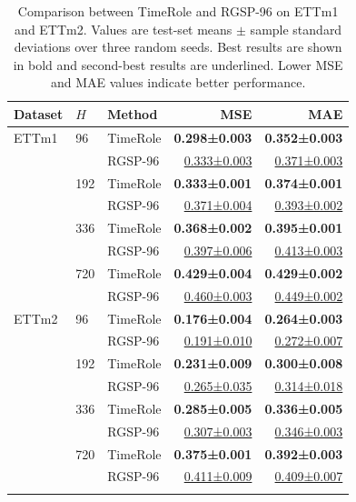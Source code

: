 \begin{table}[!t]
\tablecaptionfont
\caption{Comparison between TimeRole and RGSP-96 on ETTm1 and ETTm2. Values are test-set means $\pm$ sample standard deviations over three random seeds. Best results are shown in bold and second-best results are underlined. Lower MSE and MAE values indicate better performance.}
\label{tab:recent96-comparison}
\centering
\tablebodyfont
\fontsize{7.7}{8.9}\selectfont
\setlength{\tabcolsep}{3pt}
\renewcommand{\arraystretch}{1.08}
\begin{tabular*}{\columnwidth}{@{\extracolsep{\fill}}lllrr@{}}
\toprule\noalign{}
Dataset & \(H\) & Method & MSE & MAE \\
\midrule\noalign{}
ETTm1 & 96 & TimeRole & \textbf{0.298±0.003} & \textbf{0.352±0.003} \\
& & RGSP-96 & \underline{0.333±0.003} & \underline{0.371±0.003} \\
& 192 & TimeRole & \textbf{0.333±0.001} & \textbf{0.374±0.001} \\
& & RGSP-96 & \underline{0.371±0.004} & \underline{0.393±0.002} \\
& 336 & TimeRole & \textbf{0.368±0.002} & \textbf{0.395±0.001} \\
& & RGSP-96 & \underline{0.397±0.006} & \underline{0.413±0.003} \\
& 720 & TimeRole & \textbf{0.429±0.004} & \textbf{0.429±0.002} \\
& & RGSP-96 & \underline{0.460±0.003} & \underline{0.449±0.002} \\
\midrule
ETTm2 & 96 & TimeRole & \textbf{0.176±0.004} & \textbf{0.264±0.003} \\
& & RGSP-96 & \underline{0.191±0.010} & \underline{0.272±0.007} \\
& 192 & TimeRole & \textbf{0.231±0.009} & \textbf{0.300±0.008} \\
& & RGSP-96 & \underline{0.265±0.035} & \underline{0.314±0.018} \\
& 336 & TimeRole & \textbf{0.285±0.005} & \textbf{0.336±0.005} \\
& & RGSP-96 & \underline{0.307±0.003} & \underline{0.346±0.003} \\
& 720 & TimeRole & \textbf{0.375±0.001} & \textbf{0.392±0.003} \\
& & RGSP-96 & \underline{0.411±0.009} & \underline{0.409±0.007} \\
\bottomrule\noalign{}
\end{tabular*}
\end{table}

